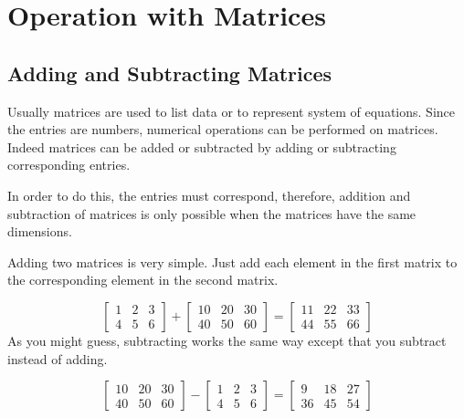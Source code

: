 \section{Operation with Matrices}
\subsection{Adding and Subtracting Matrices}
\label{adding-and-subtracting-matrices}

Usually matrices are used to list data or to represent system of equations. Since the entries are numbers, numerical operations can be performed on matrices. Indeed matrices can be added or subtracted by adding or subtracting corresponding entries.

In order to do this, the entries must correspond, therefore, addition and subtraction of matrices is only possible when the matrices have the
same dimensions.

Adding two matrices is very simple. Just add each element in the first matrix to the corresponding element in the second matrix.

\begin{equation*}
\begin{bmatrix}
1 & 2 & 3 \\
4 & 5 & 6
\end{bmatrix}
+
\begin{bmatrix}
10 & 20 & 30\\
40 & 50 & 60
\end{bmatrix}
=
\begin{bmatrix}
11 & 22 & 33\\
44 & 55 & 66
\end{bmatrix}
\end{equation*}
As you might guess, subtracting works the same way except that you subtract instead of adding.

\begin{equation*}
\begin{bmatrix}
10 & 20 & 30\\
40 & 50 & 60
\end{bmatrix}
-
\begin{bmatrix}
1 & 2 & 3 \\
4 & 5 & 6
\end{bmatrix}
=
\begin{bmatrix}
9 & 18 & 27\\
36 & 45 & 54
\end{bmatrix}
\end{equation*}

